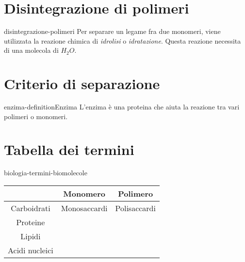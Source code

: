 \documentclass[preview]{standalone}
\begin{document}

\section{Disintegrazione di polimeri}

\begin{snippet}{disintegrazione-polimeri}
    Per separare un legame fra due monomeri, viene utilizzata la reazione chimica di \textit{idrolisi} o \textit{idratazione}.
    Questa reazione necessita di una molecola di \(H_2O\).
\end{snippet}


\section{Criterio di separazione}


\begin{snippetdefinition}{enzima-definition}{Enzima}
  L'enzima è una proteina che aiuta la reazione tra vari polimeri o monomeri.
\end{snippetdefinition}

\section{Tabella dei termini}

\begin{snippet}{biologia-termini-biomolecole}
  \begin{center}

    \begin{tabular}{ |c|c|c| }
      \hline
      & Monomero & Polimero \\ 
      \hline 
      Carboidrati & Monosaccardi & Polisaccardi \\
      \hline 
      Proteine & & \\
      \hline 
      Lipidi & & \\
      \hline 
      Acidi nucleici & & \\
      \hline

    \end{tabular}
  \end{center}
  \phantom{}
\end{snippet}

\end{document}
